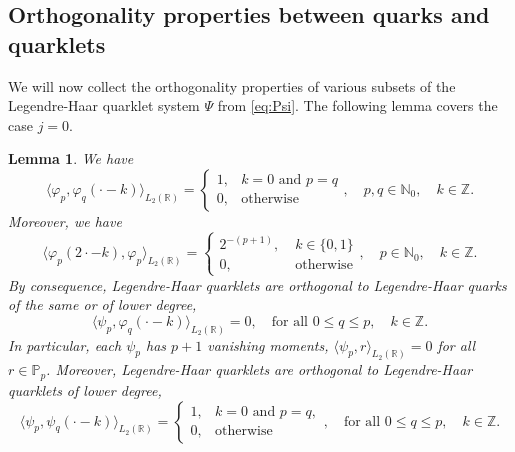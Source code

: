 \documentclass{article}
\newtheorem{lemma}[propo]{Lemma}
\begin{document}
\subsection{Orthogonality properties between quarks and quarklets}
We will now collect the orthogonality properties of various subsets of the Legendre-Haar quarklet system $\Psi$ from \eqref{eq:Psi}. The following lemma covers the case $j=0$.
\begin{lemma}\label{lemma:ortholemma1}
We have
\begin{equation}
  \label{eq:phipphiqorth}
  \big\langle\varphi_p,\varphi_q(\cdot-k)\big\rangle_{L_2(\mathds R)}=\begin{cases}
  1,&k=0\text{ and }p=q\\
  0,&\text{otherwise}
  \end{cases},\quad
  p,q\in\mathbb N_0,\quad k\in\mathbb Z.
\end{equation}
Moreover, we have
\begin{equation}
  \label{eq:phipproducts}
  \big\langle\varphi_p(2\cdot-k),\varphi_p\big\rangle_{L_2(\mathbb R)}
  =
  \begin{cases}
  2^{-(p+1)},&\;k\in\{0,1\}\\
  0,&\;\text{otherwise}
  \end{cases},
  \quad
  p\in\mathbb N_0,\quad k\in\mathbb Z.
\end{equation}
By consequence, Legendre-Haar quarklets are orthogonal to Legendre-Haar quarks of the same or of lower degree,
\begin{equation}
  \label{eq:psipphiqorth}
  \big\langle\psi_p,\varphi_q(\cdot-k)\big\rangle_{L_2(\mathbb R)}=0,
  \quad
  \text{for all } 0\le q\le p,\quad k\in\mathbb Z.
\end{equation}
In particular, each $\psi_p$ has $p+1$ vanishing moments,
$\langle\psi_p,r\rangle_{L_2(\mathbb R)}=0$ for all $r\in\mathbb P_p$.
Moreover, Legendre-Haar quarklets are orthogonal to Legendre-Haar quarklets of lower degree,
\begin{equation}
  \label{eq:psippsiqorth}
  \big\langle\psi_p,\psi_q(\cdot-k)\big\rangle_{L_2(\mathbb R)}=
  \begin{cases}
  1,&k=0\text{ and }p=q,\\
  0,&\text{otherwise}
  \end{cases},\quad
  \text{for all } 0\le q\le p,\quad k\in\mathbb Z.
\end{equation}
\end{lemma}
\end{document}
